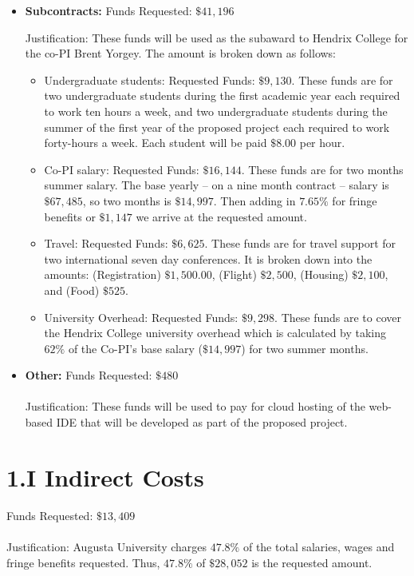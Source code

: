 \documentclass[11pt]{article}
\begin{document}
\begin{itemize}
\item \textbf{Subcontracts:} Funds Requested: $\$41,196$

  Justification: These funds will be used as the subaward to Hendrix
  College for the co-PI Brent Yorgey.  The amount is broken down as
  follows:
  \begin{itemize}
  \item Undergraduate students: Requested Funds: $\$9,130$.  These
    funds are for two undergraduate students during the first academic
    year each required to work ten hours a week, and two undergraduate
    students during the summer of the first year of the proposed
    project each required to work forty-hours a week.  Each student
    will be paid $\$8.00$ per hour.
  \item Co-PI salary: Requested Funds: $\$16,144$.  These funds are
    for two months summer salary. The base yearly -- on a nine month
    contract -- salary is $\$67,485$, so two months is $\$14,997$.
    Then adding in $7.65\%$ for fringe benefits or $\$1,147$ we arrive
    at the requested amount.
  \item Travel: Requested Funds: $\$6,625$.  These funds are for
    travel support for two international seven day conferences. It is
    broken down into the amounts: (Registration) $\$1,500.00$,
    (Flight) $\$2,500$, (Housing) $\$2,100$, and (Food) $\$525$.
  \item University Overhead: Requested Funds: $\$9,298$.  These funds
    are to cover the Hendrix College university overhead which is
    calculated by taking $62\%$ of the Co-PI's base salary
    ($\$14,997$) for two summer months.
  \end{itemize}

\item \textbf{Other:} Funds Requested: $\$480$\\ \ \\ Justification:
  These funds will be used to pay for cloud hosting of the web-based
  IDE that will be developed as part of the proposed project.
\end{itemize}


\section*{1.I Indirect Costs}
\label{sec:1.i_indirect_costs}
Funds Requested: $\$13,409$\\
\ \\
Justification: Augusta University charges $47.8\%$ of the
total salaries, wages and fringe benefits requested.  Thus, $47.8\%$
of $\$28,052$ is the requested amount.
\end{document}
